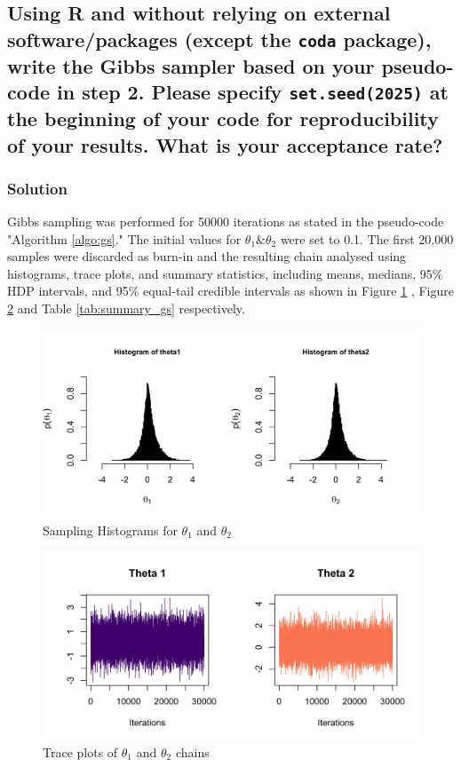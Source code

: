 \documentclass[12pt]{article}
\begin{document}
\subsection{Using R and without relying on external software/packages (except the \texttt{coda} package), write the Gibbs sampler based on your pseudo-code in step 2. Please specify \texttt{set.seed(2025)} at the beginning of your code for reproducibility of your results. What is your acceptance rate?}
\subsubsection{Solution}
Gibbs sampling was performed for 50000 iterations  as stated in the pseudo-code  "Algorithm \ref{algo:gs}." The initial values for $\theta_1 \& \theta_2$ were set to 0.1. The first 20,000 samples were discarded as burn-in and the resulting chain analysed using histograms, trace plots, and summary statistics, including means, medians, 95\% HDP intervals, and 95\% equal-tail credible intervals as shown in Figure \ref{fig:gs-histogram} , Figure \ref{fig:gs-traceplot} and Table \ref{tab:summary_gs} respectively.

\begin{figure}[h!]
    \centering
    \includegraphics[width=0.6\linewidth]{pictures/fig02-gs-histogram.png}
    \caption{Sampling Histograms for $\theta_1$ and $\theta_2$ }
    \label{fig:gs-histogram}
\end{figure}

\begin{figure}[h!]
    \centering
    \includegraphics[width=0.6\linewidth]{pictures/fig01-gs-traceplot.png}
    \caption{Trace plots of $\theta_1$ and $\theta_2$ chains }
    \label{fig:gs-traceplot}
\end{figure}
\end{document}
